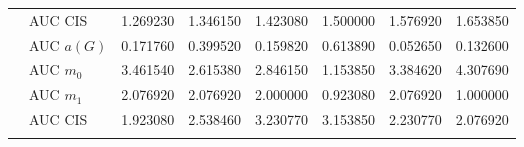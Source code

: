\begin{table}[htbp]
\begin{tabular}{llrrrrrr}
    & AUC CIS & 1.269230 & 1.346150 & 1.423080 & 1.500000 & 1.576920 & 1.653850 \\
    \addlinespace
    \multirow{4}{*}{random} & AUC $a(G)$ & 0.171760 & 0.399520 & 0.159820 & 0.613890 & 0.052650 & 0.132600 \\
    & AUC $m_0$ & 3.461540 & 2.615380 & 2.846150 & 1.153850 & 3.384620 & 4.307690 \\
    & AUC $m_1$ & 2.076920 & 2.076920 & 2.000000 & 0.923080 & 2.076920 & 1.000000 \\
    & AUC CIS & 1.923080 & 2.538460 & 3.230770 & 3.153850 & 2.230770 & 2.076920 \\
    \addlinespace
    \bottomrule
  \end{tabular}
\end{table}

